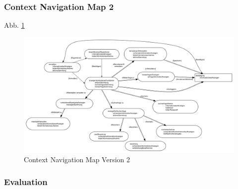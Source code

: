 \subsubsection{Context Navigation Map 2}

Abb. \ref{fig:navigationmap2}
\begin{figure}[H]
\includegraphics[width=1\textwidth]{./images/navigationmap2.png}
\caption{Context Navigation Map Version 2}
\label{fig:navigationmap2}
\end{figure}

\newpage
\subsubsection{Evaluation}


